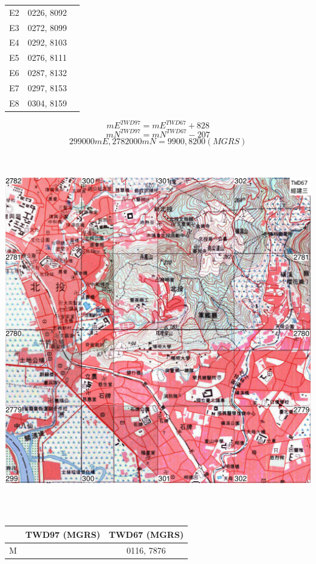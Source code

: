 \documentclass{article}
\begin{document}
\begin{multicols}{2}
\begin{tabular}{|c|c|c|}
	E2 & 0226, 8092 & \\
	E3 & 0272, 8099 & \\
	E4 & 0292, 8103 & \\
	E5 & 0276, 8111 & \\
	E6 & 0287, 8132 & \\
	E7 & 0297, 8153 & \\
	E8 & 0304, 8159 & \\
	\hline
\end{tabular}
\newpage
\begin{equation} 
	mE^{TWD97 }= mE^{TWD67} + 828 
\end{equation} 
\begin{equation} 
	mN^{TWD97 }= mN^{TWD67} - 207
\end{equation} 
\begin{equation} 
	299000mE, 2782000mN = 9900, 8200 (MGRS)	
\end{equation} 
\includegraphics[width=16cm, height=16cm]{v3.png}
\begin{tabular}{|c|c|c|}
	\hline
	& TWD97 (MGRS) & TWD67 (MGRS)\\  
	\hline
	M & & 0116, 7876\\ 

\end{tabular}
\end{multicols}
\end{document}
